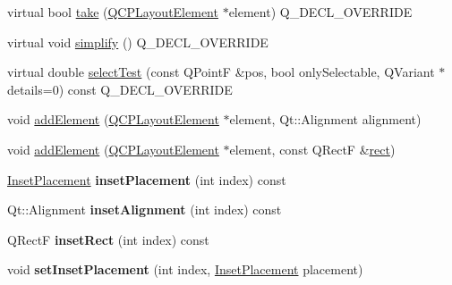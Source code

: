\begin{DoxyCompactItemize}
\item 
virtual bool \hyperlink{class_q_c_p_layout_inset_af7f13cc369f8190b5e7e17d5f39dfe1c}{take} (\hyperlink{class_q_c_p_layout_element}{Q\+C\+P\+Layout\+Element} $\ast$element) Q\+\_\+\+D\+E\+C\+L\+\_\+\+O\+V\+E\+R\+R\+I\+DE
\item 
virtual void \hyperlink{class_q_c_p_layout_inset_a18b7d508f0baa60cc5dcb1343cf7f32a}{simplify} () Q\+\_\+\+D\+E\+C\+L\+\_\+\+O\+V\+E\+R\+R\+I\+DE
\item 
virtual double \hyperlink{class_q_c_p_layout_inset_a2eeef7ea1b8340e7c7c2e2fc229df5ea}{select\+Test} (const Q\+PointF \&pos, bool only\+Selectable, Q\+Variant $\ast$details=0) const Q\+\_\+\+D\+E\+C\+L\+\_\+\+O\+V\+E\+R\+R\+I\+DE
\item 
void \hyperlink{class_q_c_p_layout_inset_ad61529eb576af7f04dff94abb10c745a}{add\+Element} (\hyperlink{class_q_c_p_layout_element}{Q\+C\+P\+Layout\+Element} $\ast$element, Qt\+::\+Alignment alignment)
\item 
void \hyperlink{class_q_c_p_layout_inset_a8ff61fbee4a1f0ff45c398009d9f1e56}{add\+Element} (\hyperlink{class_q_c_p_layout_element}{Q\+C\+P\+Layout\+Element} $\ast$element, const Q\+RectF \&\hyperlink{class_q_c_p_layout_element_a208effccfe2cca4a0eaf9393e60f2dd4}{rect})
\item 
\mbox{\label{class_q_c_p_layout_inset_af018971c512b19893b088a9f0a5b986d}} 
\hyperlink{class_q_c_p_layout_inset_a8b9e17d9a2768293d2a7d72f5e298192}{Inset\+Placement} {\bfseries inset\+Placement} (int index) const
\item 
\mbox{\label{class_q_c_p_layout_inset_a5b33b66f0abbb4a7cc2f8aa6c94cf7f8}} 
Qt\+::\+Alignment {\bfseries inset\+Alignment} (int index) const
\item 
\mbox{\label{class_q_c_p_layout_inset_ab23099a46af17c31f4c40668f13c9de1}} 
Q\+RectF {\bfseries inset\+Rect} (int index) const
\item 
\mbox{\label{class_q_c_p_layout_inset_a63298830744d5d8c5345511c00fd2144}} 
void {\bfseries set\+Inset\+Placement} (int index, \hyperlink{class_q_c_p_layout_inset_a8b9e17d9a2768293d2a7d72f5e298192}{Inset\+Placement} placement)
\item 
\mbox{\label{class_q_c_p_layout_inset_a62882a4f9ad58bb0f53da12fde022abe}} 

\end{DoxyCompactItemize}
